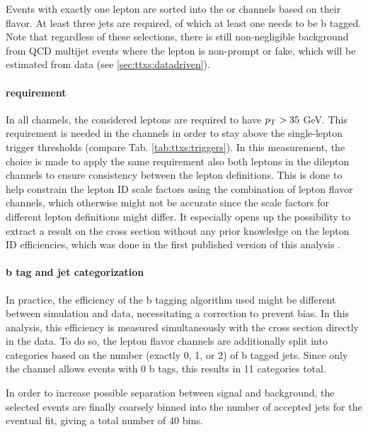 Events with exactly one lepton are sorted into the \ejets or \mujets channels based on their flavor. At least three jets are required, of which at least one needs to be b tagged. Note that regardless of these selections, there is still non-negligible background from QCD multijet events where the lepton is non-prompt or fake, which will be estimated from data (see \cref{sec:ttxs:datadriven}).

\paragraph{\pt requirement}

In all channels, the considered leptons are required to have $p_{\mathrm{T}} > 35$ GeV. This requirement is needed in the \ljets channels in order to stay above the single-lepton trigger \pt thresholds (compare Tab. \ref{tab:ttxs:triggers}). In this measurement, the choice is made to apply the same \pt requirement also both leptons in the dilepton channels to ensure consistency between the lepton definitions. This is done to help constrain the lepton ID scale factors using the combination of lepton flavor channels, which otherwise might not be accurate since the scale factors for different lepton definitions might differ. It especially opens up the possibility to extract a result on the cross section without any prior knowledge on the lepton ID efficiencies, which was done in the first published version of this analysis \cite{CMS:TOP-22-012-PAS}. %

\paragraph{b tag and jet categorization}

In practice, the efficiency of the b tagging algorithm used might be different between simulation and data, necessitating a correction to prevent bias. In this analysis, this efficiency is measured simultaneously with the cross section directly in the data. To do so, the lepton flavor channels are additionally split into categories based on the number (exactly 0, 1, or 2) of b tagged jets. Since only the \emu channel allows events with 0 b tags, this results in 11 categories total.

In order to increase possible separation between \ttbar signal and background, the selected events are finally coarsely binned into the number of accepted jets for the eventual fit, giving a total number of 40 bins.


